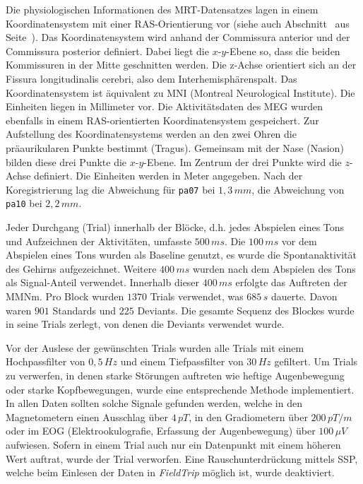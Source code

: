 \documentclass[doc,a4paper,12pt]{apa6}
\makeatletter
\DeclareRobustCommand*{\nameref}[1]{%
      \glqq{\myorg@nameref{#1}}\grqq%
    }%
\makeatother
\begin{document}
Die physiologischen Informationen des MRT-Datensatzes lagen in einem Koordinatensystem mit einer RAS-Orientierung vor (siehe auch Abschnitt~\nameref{sec:coreg} aus Seite~\pageref{sec:coreg}). Das Koordinatensystem wird anhand der Commissura anterior und der Commissura posterior definiert. Dabei liegt die $x$-$y$-Ebene so, dass die beiden Kommissuren in der Mitte geschnitten werden. Die z-Achse orientiert sich an der Fissura longitudinalis cerebri, also dem Interhemisphärenspalt. Das Koordinatensystem ist äquivalent zu MNI (Montreal Neurological Institute). Die Einheiten liegen in Millimeter vor. Die Aktivitätsdaten des MEG wurden ebenfalls in einem RAS-orientierten Koordinatensystem gespeichert. Zur Aufstellung des Koordinatensystems werden an den zwei Ohren die präaurikularen Punkte bestimmt (Tragus). Gemeinsam mit der Nase (Nasion) bilden diese drei Punkte die $x$-$y$-Ebene. Im Zentrum der drei Punkte wird die $z$-Achse definiert. Die Einheiten werden in Meter angegeben. Nach der Koregistrierung lag die Abweichung für \texttt{pa07} bei $1,3\,mm$, die Abweichung von \texttt{pa10} bei $2,2\,mm$.

Jeder Durchgang (Trial) innerhalb der Blöcke, d.h. jedes Abspielen eines Tons und Aufzeichnen der Aktivitäten, umfasste $500\,ms$. Die $100\,ms$ vor dem Abspielen eines Tons wurden als Baseline genutzt, es wurde die Spontanaktivität des Gehirns aufgezeichnet. Weitere $400\,ms$ wurden nach dem Abspielen des Tons als Signal-Anteil verwendet. Innerhalb dieser $400\,ms$ erfolgte das Auftreten der MMNm. Pro Block wurden $1370$ Trials verwendet, was $685\,s$ dauerte. Davon waren $901$ Standards und $225$ Deviants. Die gesamte Sequenz des Blockes wurde in seine Trials zerlegt, von denen die Deviants verwendet wurde.

Vor der Auslese der gewünschten Trials wurden alle Trials mit einem Hochpassfilter von $0,5\,Hz$ und einem Tiefpassfilter von $30\,Hz$ gefiltert. Um Trials zu verwerfen, in denen starke Störungen auftreten wie heftige Augenbewegung oder starke Kopfbewegungen, wurde eine entsprechende Methode implementiert. In allen Daten sollten solche Signale gefunden werden, welche in den Magnetometern einen Ausschlag über $4\,pT$, in den Gradiometern über $200\,pT/m$ oder im EOG (Elektrookulografie, Erfassung der Augenbewegung) über $100\,\mu V$ aufwiesen. Sofern in einem Trial auch nur ein Datenpunkt mit einem höheren Wert auftrat, wurde der Trial verworfen. Eine Rauschunterdrückung mittels SSP, welche beim Einlesen der Daten in \emph{FieldTrip} möglich ist, wurde deaktiviert.
\end{document}
